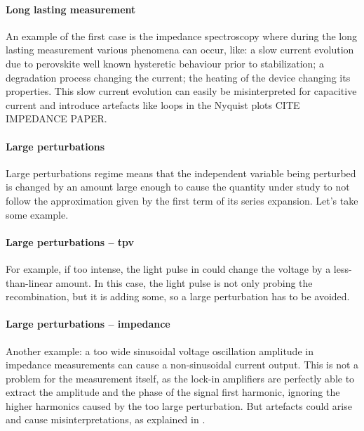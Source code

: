		\paragraph{Long lasting measurement} An example of the first case is the impedance spectroscopy where during the long lasting measurement various phenomena can occur, like: a slow current evolution due to perovskite well known hysteretic behaviour prior to stabilization; a degradation process changing the current; the heating of the device changing its properties. This slow current evolution can easily be misinterpreted for capacitive current \cite{Jacobs2018} and introduce artefacts like loops in the Nyquist plots CITE IMPEDANCE PAPER.

		\paragraph{Large perturbations} \label{perturbation} Large perturbations regime means that the independent variable being perturbed is changed by an amount large enough to cause the quantity under study to not follow the approximation given by the first term of its series expansion. Let's take some example.

		\paragraph{Large perturbations -- \gls{tpv}} For example, if too intense, the light pulse in  could change the voltage by a less-than-linear amount. In this case, the light pulse is not only probing the recombination, but it is adding some, so a large perturbation has to be avoided.

		\paragraph{Large perturbations -- impedance} Another example: a too wide sinusoidal voltage oscillation amplitude in impedance measurements can cause a non-sinusoidal current output. This is not a problem for the measurement itself, as the lock-in amplifiers are perfectly able to extract the amplitude and the phase of the signal first harmonic, ignoring the higher harmonics caused by the too large perturbation. But artefacts could arise and cause misinterpretations, as explained in .

